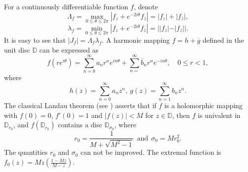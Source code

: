 \documentclass[a4paper,12pt]{amsart}
\theoremstyle{plain}
\theoremstyle{definition}
\newcounter {own}
\begin{document}

For a continuously differentiable function $f$, denote
$$
\Lambda_f=\max _{0 \leq \theta \leq 2 \pi}\left|f_z+e^{-2 i \theta} f_{\bar{z}}\right|=\left|f_z\right|+\left|f_{\bar{z}}\right|,$$
$$
\lambda_f=\min _{0 \leq \theta \leq 2 \pi}\left|f_z+e^{-2 i \theta} f_{\bar{z}}\right|=|| f_z|-| f_{\bar{z}}|| .
$$
It is easy to see that $\left|J_f\right|=\Lambda_f \lambda_f$.\vspace{1mm}
 A harmonic mapping $f=h+\overline{g}$ defined in the unit disc $\mathbb{D}$ can be expressed as
$$
f\left(r e^{i \theta}\right)=\sum_{n=0}^{\infty} a_n r^{n} e^{i n \theta}+\sum_{n=}^{\infty} \bar{b}_n r^{n} e^{-i n \theta},\quad 0 \leq r<1,
$$
where $$h(z)=\sum_{n=0}^{\infty} {a}_{n} z^n,   \ g(z)=\sum_{n=1}^{\infty} {b}_n z^n.
$$
The classical Landau theorem (see \cite{Landau-1926}) asserts that if $f$ is a holomorphic mapping with $f(0)=0$, $f'(0)=1$ and $|f(z)|<M$ for $z \in \mathbb{D}$, then $f$ is univalent in $\mathbb{D}_{r_0}$, and $f(\mathbb{D}_{r_0})$ contains a disc $\mathbb{D}_{\sigma_0}$, where $$r_0=\frac{1}{M+\sqrt{M^2-1}}\ \ \text{and} \ \ \sigma_0= Mr_0^2.$$
  The quantities $r_0$ and $\sigma_0$ can not be improved. The extremal function is $f_0(z)= Mz \left(\frac{1-Mz}{M-z}\right)$.\vspace{2mm}
\end{document}
